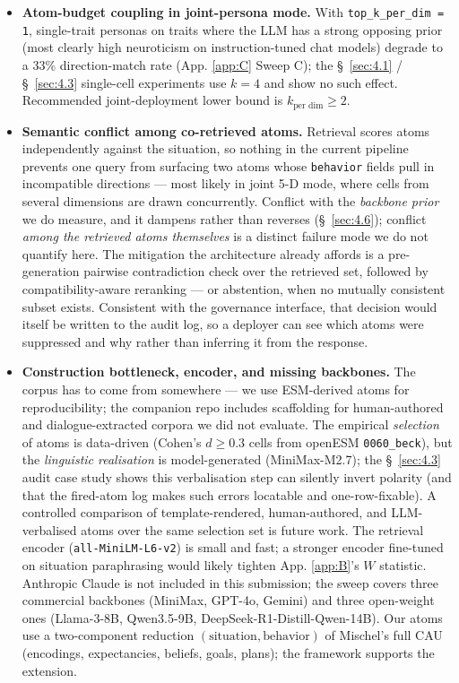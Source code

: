 \begin{itemize}
\item \textbf{Atom-budget coupling in joint-persona mode.} With \texttt{top\_\allowbreak{}k\_\allowbreak{}per\_\allowbreak{}dim = 1}, single-trait personas on traits where the LLM has a strong opposing prior (most clearly high neuroticism on instruction-tuned chat models) degrade to a 33\% direction-match rate (App. \ref{app:C} Sweep C); the \S~\ref{sec:4.1} / \S~\ref{sec:4.3} single-cell experiments use $k = 4$ and show no such effect. Recommended joint-deployment lower bound is $k_\text{per dim} \geq 2$.
\item \textbf{Semantic conflict among co-retrieved atoms.} Retrieval scores atoms independently against the situation, so nothing in the current pipeline prevents one query from surfacing two atoms whose \texttt{behavior} fields pull in incompatible directions --- most likely in joint 5-D mode, where cells from several dimensions are drawn concurrently. Conflict with the \textit{backbone prior} we do measure, and it dampens rather than reverses (\S~\ref{sec:4.6}); conflict \textit{among the retrieved atoms themselves} is a distinct failure mode we do not quantify here. The mitigation the architecture already affords is a pre-generation pairwise contradiction check over the retrieved set, followed by compatibility-aware reranking --- or abstention, when no mutually consistent subset exists. Consistent with the governance interface, that decision would itself be written to the audit log, so a deployer can see which atoms were suppressed and why rather than inferring it from the response.
\item \textbf{Construction bottleneck, encoder, and missing backbones.} The corpus has to come from somewhere --- we use ESM-derived atoms for reproducibility; the companion repo includes scaffolding for human-authored and dialogue-extracted corpora we did not evaluate. The empirical \textit{selection} of atoms is data-driven (Cohen's $d \geq 0.3$ cells from openESM \texttt{0060\_\allowbreak{}beck}), but the \textit{linguistic realisation} is model-generated (MiniMax-M2.7); the \S~\ref{sec:4.3} audit case study shows this verbalisation step can silently invert polarity (and that the fired-atom log makes such errors locatable and one-row-fixable). A controlled comparison of template-rendered, human-authored, and LLM-verbalised atoms over the same selection set is future work. The retrieval encoder (\texttt{all-\allowbreak{}MiniLM-\allowbreak{}L6-\allowbreak{}v2}) is small and fast; a stronger encoder fine-tuned on situation paraphrasing would likely tighten App. \ref{app:B}'s $W$ statistic. Anthropic Claude is not included in this submission; the sweep covers three commercial backbones (MiniMax, GPT-4o, Gemini) and three open-weight ones (Llama-3-8B, Qwen3.5-9B, DeepSeek-R1-Distill-Qwen-14B). Our atoms use a two-component reduction $(\text{situation}, \text{behavior})$ of Mischel's full CAU (encodings, expectancies, beliefs, goals, plans); the framework supports the extension.

\end{itemize}
